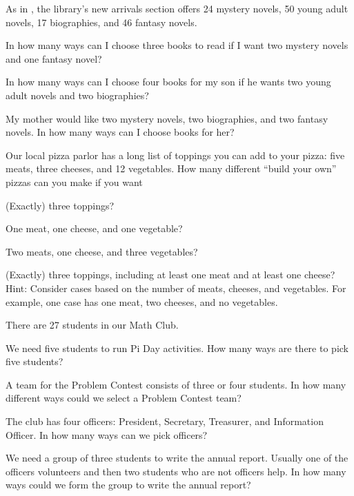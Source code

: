 \begin{exer}[\exerU] %
\label{exer_library_books_complicated}
    As in , the library's new arrivals section offers 24 mystery novels, 50 young adult novels, 17 biographies, and 46 fantasy novels. 
        \begin{exerpart}
            \item In how many ways can I choose three books to read if I want two mystery novels and one fantasy novel?
            \item In how many ways can I choose four books for my son if he wants two young adult novels and two biographies?
            \item My mother would like two mystery novels, two biographies, and two fantasy novels.  In how many ways can I choose books for her?
        \end{exerpart}
\end{exer}

\begin{exer} [\exerU] %
\label{exer_pizza_options}
Our local pizza parlor has a long list of toppings you can add to your pizza: five meats, three cheeses, and 12 vegetables.  How many different ``build your own'' pizzas can you make if you want
    \begin{exerpart}
        \item (Exactly) three toppings? 
        \item One meat, one cheese, and one vegetable?
        \item Two meats, one cheese, and three vegetables?
        \item (Exactly) three toppings, including at least one meat and at least one cheese?  Hint: Consider cases based on the number of meats, cheeses, and vegetables.  For example, one case has one meat, two cheeses, and no vegetables. 
    \end{exerpart}
\end{exer}

\begin{exer}[\exerU] %
\label{exer_unbounded}
    There are 27 students in our Math Club.
        \begin{exerpart}            
            \item We need five students to run Pi Day activities.  How many ways are there to pick five students?
            \item A team for the Problem Contest consists of three or four students.  In how many different ways could we select a Problem Contest team?
            \item The club has four officers: President, Secretary, Treasurer, and Information Officer.  In how many ways can we pick officers?
            \item We need a group of three students to write the annual report.  Usually one of the officers volunteers and then two students who are not officers help.  In how many ways could we form the group to write the annual report?
        \end{exerpart}
\end{exer}

